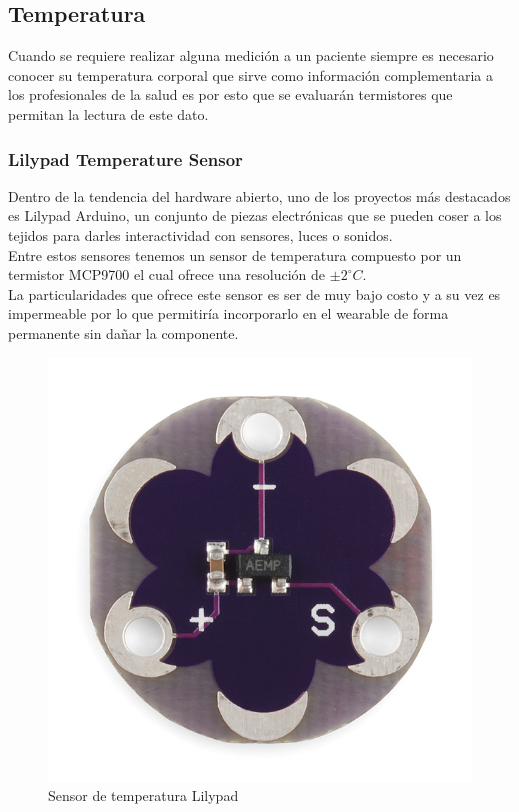 \subsection{Temperatura}
Cuando se requiere realizar alguna medición a un paciente siempre es necesario conocer su temperatura corporal que sirve como información complementaria a los profesionales de la salud es por esto que se evaluarán termistores que permitan la lectura de este dato.
\subsubsection{Lilypad Temperature Sensor}
Dentro de la tendencia del hardware abierto, uno de los proyectos más destacados es Lilypad Arduino, un conjunto de piezas electrónicas que se pueden coser a los tejidos para darles interactividad con sensores, luces o sonidos.\\
Entre estos sensores tenemos un sensor de temperatura compuesto por un termistor MCP9700 el cual ofrece una resolución de $\pm2^\circ C.$\\

\newpage
La particularidades que ofrece este sensor es ser de muy bajo costo y a su vez es impermeable por lo que permitiría incorporarlo en el wearable de forma permanente sin dañar la componente.

\begin{figure}[H]
	\centering
	\includegraphics[scale=0.7]{figuras/sensor/t/lilypad.jpg}
	\caption{Sensor de temperatura Lilypad}
	\label{Lilypad}
\end{figure}

